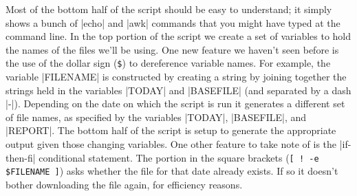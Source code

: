 Most of the bottom half of the script should be easy to understand; it simply shows a bunch of |echo| and |awk| commands that you might have typed at the command line. In the top portion of the script we create a set of variables to hold the names of the files we'll be using. One new feature we haven't seen before is the use of the dollar sign (\verb|$|) to dereference variable names.  For example, the variable |FILENAME| is constructed by creating a string by joining together the strings held in the variables |TODAY| and |BASEFILE| (and separated by a dash |-|). Depending on the date on which the script is run it generates a different set of file names, as specified by the variables |TODAY|, |BASEFILE|, and |REPORT|.  The bottom half of the script is setup to generate the appropriate output given those changing variables.  One other feature to take note of is the |if-then-fi| conditional statement. The portion in the square brackets (\verb|[ ! -e $FILENAME ]|) asks whether the file for that date already exists. If so it doesn't bother downloading the file again, for efficiency reasons.


